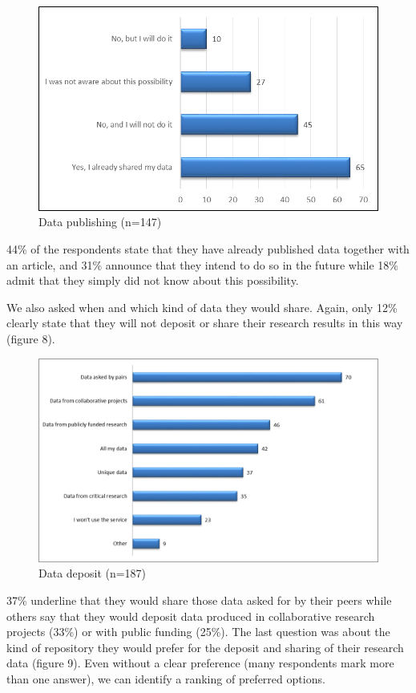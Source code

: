 \documentclass[a4paper,
fontsize=11pt,
oneside,
numbers=noperiodatend,
parskip=half-,
bibliography=totoc,
final
]{scrartcl}
\begin{document}
\begin{figure}[htbp]
\centering
\includegraphics{figures/media/image7.png}
\caption{Data publishing (n=147)}
\end{figure}

44\% of the respondents state that they have already published data
together with an article, and 31\% announce that they intend to do so in
the future while 18\% admit that they simply did not know about this
possibility.

We also asked when and which kind of data they would share. Again, only
12\% clearly state that they will not deposit or share their research
results in this way (figure 8).

\begin{figure}[htbp]
\centering
\includegraphics{figures/media/image8.png}
\caption{Data deposit (n=187)}
\end{figure}

37\% underline that they would share those data asked for by their peers
while others say that they would deposit data produced in collaborative
research projects (33\%) or with public funding (25\%). The last
question was about the kind of repository they would prefer for the
deposit and sharing of their research data (figure 9). Even without a
clear preference (many respondents mark more than one answer), we can
identify a ranking of preferred options.
\end{document}
